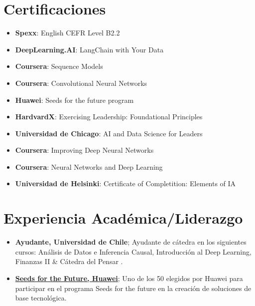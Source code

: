 \documentclass[letterpaper,11pt]{article}
\newcommand{\resumeItem}[2]{
  \item\small{
    \textbf{#1}{#2 \vspace{-2pt}}
  }
}
\newcommand{\resumeSubItem}[2]{\resumeItem{#1}{#2}\vspace{-4pt}}
\newcommand{\resumeSubItemcol}[2]{\resumeItem{#1}{#2}\vspace{-8pt}}
\newcommand{\resumeSubHeadingListStart}{\begin{itemize}[leftmargin=*]}
\newcommand{\resumeSubHeadingListEnd}{\end{itemize}}
\begin{document}
\section{Certificaciones}
\vspace{-15pt}
  \begin{multicols}{2}
    \resumeSubHeadingListStart
    \resumeSubItemcol{Spexx}{: English CEFR Level B2.2}
    \resumeSubItemcol{DeepLearning.AI}{: LangChain with Your Data}
    \resumeSubItemcol{Coursera}{: Sequence Models}
    \resumeSubItemcol{Coursera}{: Convolutional Neural Networks}
    \resumeSubItemcol{Huawei}{: Seeds for the future program}
    \resumeSubItemcol{HardvardX}{: Exercising Leadership: Foundational Principles}
    \resumeSubItemcol{Universidad de Chicago}{: AI and Data Science for Leaders}
    \resumeSubItemcol{Coursera}{: Improving Deep Neural Networks}
    \resumeSubItemcol{Coursera}{: Neural Networks and Deep Learning}
    \resumeSubItemcol{Universidad de Helsinki}{: Certificate of Completition: Elements of IA}
  \resumeSubHeadingListEnd
  \end{multicols}
\section{Experiencia Académica/Liderazgo}
 \resumeSubHeadingListStart
  \resumeSubItem
    {Ayudante, Universidad de Chile}
    {; Ayudante de cátedra en los siguientes cursos: Análisis de Datos e Inferencia Causal, Introducción al Deep Learning, Finanzas II \& Cátedra del Pensar
    .}
  \resumeSubItem
    {\href{https://ingenieria.uchile.cl/noticias/188882/estudiantes-fcfm-destacaron-en-5ta-version-del-programa-huawei}{Seeds for the Future, Huawei}}
    {; Uno de los 50 elegidos por Huawei para participar en el programa Seeds for the future en la creación de soluciones de base tecnológica.}
  \resumeSubHeadingListEnd
\end{document}
